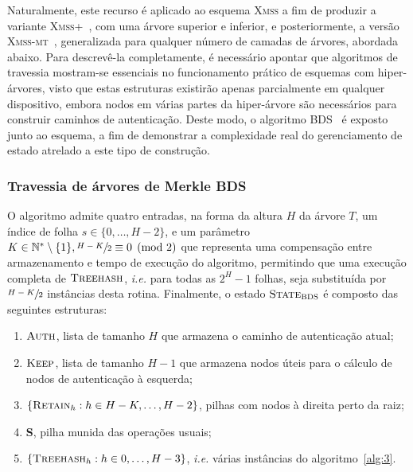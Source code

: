 \documentclass[12pt,notitlepage]{report}
\newcommand{\xmss}{\textsc{Xmss}}
\newcommand{\xmssmt}{\textsc{Xmss-mt}}
\begin{document}
Naturalmente, este recurso é aplicado ao esquema \xmss{} a fim de produzir a variante \xmss{}+~\cite{xmssplus}, com uma árvore superior e inferior, e posteriormente, a versão \xmssmt{}~\cite{xmssmt}, generalizada para qualquer número de camadas de árvores, abordada abaixo. Para descrevê-la completamente, é necessário apontar que algoritmos de travessia mostram-se essenciais no funcionamento prático de esquemas com hiper-árvores, visto que estas estruturas existirão apenas parcialmente em qualquer dispositivo, embora nodos em várias partes da hiper-árvore são necessários para construir caminhos de autenticação. Deste modo, o algoritmo BDS~\cite{Buchmann:2008:MTT:1473109.1473114} é exposto junto ao esquema, a fim de demonstrar a complexidade real do gerenciamento de estado atrelado a este tipo de construção.

\subsubsection{Travessia de árvores de Merkle BDS}

O algoritmo admite quatro entradas, na forma da altura $H$ da árvore $T$, um índice de folha $s \in \{0, \dots, H - 2\}$, e um parâmetro $K \in \mathbb{N}^{*} \setminus \{1\}, \sfrac{H - K}{2} \equiv 0 \pmod{2}$ que representa uma compensação entre armazenamento e tempo de execução do algoritmo, permitindo que uma execução completa de $\textsc{Treehash}$, \emph{i.e.} para todas as $2^H - 1$ folhas, seja substituída por $\sfrac{H - K}{2}$ instâncias desta rotina. Finalmente, o estado $\textsc{State}_{\textsc{BDS}}$ é composto das seguintes estruturas:

\begin{enumerate}[label=(\roman*)]

    \item $\textsc{Auth}$, lista de tamanho $H$ que armazena o caminho de autenticação atual;

    \item $\textsc{Keep}$, lista de tamanho $H - 1$ que armazena nodos úteis para o cálculo de nodos de autenticação à esquerda;

    \item $\{\textsc{Retain}_{h} : h \in H - K, \dots, H - 2\}$, pilhas com nodos à direita perto da raiz;

    \item \textbf{S}, pilha munida das operações usuais;

    \item $\{\textsc{Treehash}_{h} : h \in 0, \dots, H - 3\}$, \emph{i.e.} várias instâncias do algoritmo~\ref{alg:3}.
\end{enumerate}
\end{document}
